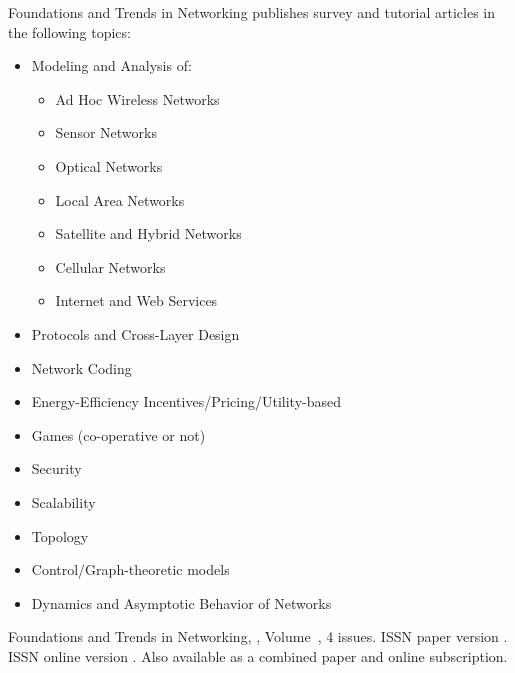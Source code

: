 


\journalaimsandscope
 {%
  Foundations and Trends\textsuperscript{\textregistered} in
Networking publishes
 survey and tutorial articles in the following topics:
 \begin{multicols}{2}\raggedcolumns
 \begin{itemize}
\item{Modeling and Analysis of:}
	\begin{itemize}
	\item{Ad Hoc Wireless Networks}
	\item{Sensor Networks}
	\item{Optical Networks}
	\item{Local Area Networks}
	\item{Satellite and Hybrid Networks}
	\item{Cellular Networks}
	\item{Internet and Web Services}
	\end{itemize}
\item{Protocols and Cross-Layer Design}
\item{Network Coding}
\item{Energy-Efficiency Incentives/Pricing/Utility-based}
\item{Games (co-operative or not)}
\item{Security}
\item{Scalability}
\item{Topology}
\item{Control/Graph-theoretic models}
\item{Dynamics and Asymptotic Behavior of Networks}
\end{itemize}
 \end{multicols}
 }


\journallibraryinfo
 {%
  Foundations and Trends\textsuperscript{\textregistered} in
  Networking, ,
  Volume~, 4 issues.
  ISSN paper version .
  ISSN online version .
  Also available as a combined paper and online
  subscription.
 } 